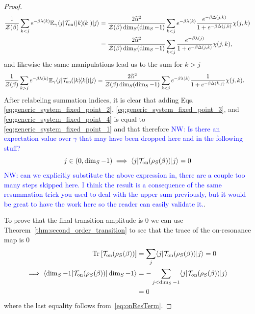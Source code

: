 \documentclass{article}
\newcommand{\on}{\rm on}
\newcommand{\ket}[1]{|#1\rangle}
\newcommand{\bra}[1]{\langle #1|}
\newcommand{\ketbra}[2]{| #1\rangle\! \langle #2|}
\newcommand{\brackets}[1]{\left[ #1 \right]}
\DeclareMathOperator{\Tr}{Tr}
\newcommand{\trace}[1]{\Tr \brackets{ #1 }}
\newcommand{\partfun}{\mathcal{Z}}
\begin{document}
\begin{proof}
\begin{align}
    \frac{1}{\partfun(\beta)} \sum_{k < j} e^{-\beta \lambda(k)} \mathbb{E}_{\gamma} \bra{j} \mathcal{T}_{\on}(\ketbra{k}{k}) \ket{j} &= \frac{2 \widetilde{\alpha}^2 }{\partfun(\beta) \dim_S(\dim_S - 1) } \sum_{k < j} e^{-\beta \lambda(k)} \frac{e^{-\beta \Delta(j, k)}}{1 + e^{-\beta \Delta(j, k)}} \chi(j, k) \\
    &= \frac{2 \widetilde{\alpha}^2 }{\partfun(\beta) \dim_S(\dim_S - 1) } \sum_{k < j} \frac{e^{-\beta \lambda(j)}}{1 + e^{-\beta \Delta(j, k)}} \chi(j, k), \label{eq:generic_system_fixed_point_3}
\end{align}
and likewise the same manipulations lead us to the sum for $k>j$
\begin{align}
    \frac{1}{\partfun(\beta)} \sum_{k > j} e^{-\beta \lambda(k)} \mathbb{E}_{\gamma} \bra{j} \mathcal{T}_{\on}(\ketbra{k}{k}) \ket{j} &= \frac{2 \widetilde{\alpha}^2 }{\partfun(\beta) \dim_S(\dim_S - 1) } \sum_{k < j} e^{-\beta \lambda(k)} \frac{1}{1 + e^{-\beta \Delta(k, j)}} \chi(j, k). \label{eq:generic_system_fixed_point_4}
\end{align}
After relabeling summation indices, it is clear that adding Eqs. \eqref{eq:generic_system_fixed_point_2}, \eqref{eq:generic_system_fixed_point_3}, and \eqref{eq:generic_system_fixed_point_4} is equal to \eqref{eq:generic_system_fixed_point_1} and that therefore \textcolor{blue}{NW: Is there an expectation value over $\gamma$ that may have been dropped here and in the following stuff?}
\begin{equation}
    j\in (0,\dim_S - 1) \implies \bra{j} \mathcal{T}_{\on}(\rho_S(\beta)) \ket{j} = 0
\end{equation} \textcolor{blue}{NW: can we explicitly substitute the above expression in, there are a couple too many steps skipped here.  I think the result is a consequence of the same resummation trick you used to deal with the upper sum previously, but it would be great to have the work here so the reader can easily validate it.}.

To prove that the final transition amplitude is 0 we can use Theorem~\ref{thm:second_order_transition} to see that the trace of the on-resonance map is 0
\begin{align}
    \trace{\mathcal{T}_{\on}(\rho_S(\beta))} &= \sum_j \bra{j} \mathcal{T}_{\on}(\rho_S(\beta)) \ket{j} = 0\\
    \implies \bra{\dim_S - 1} \mathcal{T}_{\on}(\rho_S(\beta)) \ket{\dim_S - 1} &= - \sum_{j < \dim_S - 1} \bra{j} \mathcal{T}_{\on}(\rho_S(\beta)) \ket{j} \\ 
    &= 0
\end{align}
where the last equality follows from~\eqref{eq:onResTerm}.


\end{proof}
\end{document}
